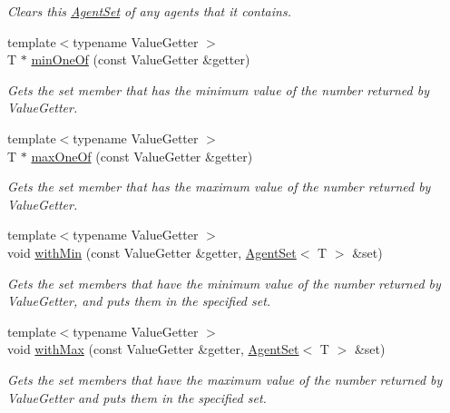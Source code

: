 \begin{DoxyCompactItemize}
\begin{DoxyCompactList}\small\item\em Clears this \hyperlink{classrepast_1_1relogo_1_1_agent_set}{Agent\-Set} of any agents that it contains. \end{DoxyCompactList}\item 
{\footnotesize template$<$typename Value\-Getter $>$ }\\T $\ast$ \hyperlink{classrepast_1_1relogo_1_1_agent_set_af51f6858bfa282b98803663fd98ee586}{min\-One\-Of} (const Value\-Getter \&getter)
\begin{DoxyCompactList}\small\item\em Gets the set member that has the minimum value of the number returned by Value\-Getter. \end{DoxyCompactList}\item 
{\footnotesize template$<$typename Value\-Getter $>$ }\\T $\ast$ \hyperlink{classrepast_1_1relogo_1_1_agent_set_a3ee8b550f0157ae73c0bd9b63debef14}{max\-One\-Of} (const Value\-Getter \&getter)
\begin{DoxyCompactList}\small\item\em Gets the set member that has the maximum value of the number returned by Value\-Getter. \end{DoxyCompactList}\item 
{\footnotesize template$<$typename Value\-Getter $>$ }\\void \hyperlink{classrepast_1_1relogo_1_1_agent_set_a56e27a6154a3bb13310a8e4e9e7e75ab}{with\-Min} (const Value\-Getter \&getter, \hyperlink{classrepast_1_1relogo_1_1_agent_set}{Agent\-Set}$<$ T $>$ \&set)
\begin{DoxyCompactList}\small\item\em Gets the set members that have the minimum value of the number returned by Value\-Getter, and puts them in the specified set. \end{DoxyCompactList}\item 
{\footnotesize template$<$typename Value\-Getter $>$ }\\void \hyperlink{classrepast_1_1relogo_1_1_agent_set_a3a1086c427446de2b5587a442b044a01}{with\-Max} (const Value\-Getter \&getter, \hyperlink{classrepast_1_1relogo_1_1_agent_set}{Agent\-Set}$<$ T $>$ \&set)
\begin{DoxyCompactList}\small\item\em Gets the set members that have the maximum value of the number returned by Value\-Getter and puts them in the specified set. \end{DoxyCompactList}\item 

\end{DoxyCompactItemize}
